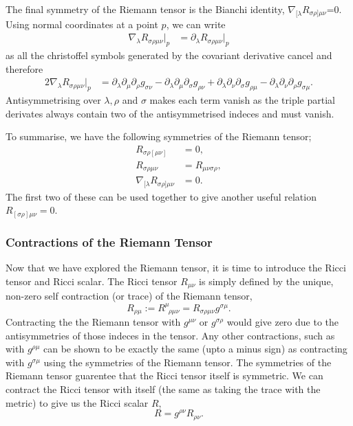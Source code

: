 The final symmetry of the Riemann tensor is the Bianchi identity, $\nabla_{[\lambda}R_{\sigma\rho]\mu\nu}$=0. Using normal coordinates at a point $p$, we can write
\begin{align}
\nabla_\lambda R_{\sigma\rho\mu\nu}\big|_p &= \partial_\lambda R_{\sigma\rho\mu\nu}\big|_p
\end{align}
as all the christoffel symbols generated by the covariant derivative cancel and therefore
\begin{align}
2\nabla_\lambda R_{\sigma\rho\mu\nu}\big|_p &= \partial_\lambda \partial_{\mu} \partial_\rho g_{\sigma\nu} - \partial_\lambda \partial_{\mu} \partial_\sigma g_{\rho\nu} + \partial_\lambda \partial_{\nu} \partial_\sigma g_{\rho\mu} - \partial_\lambda \partial_{\nu} \partial_\rho g_{\sigma\mu}.
\end{align}
Antisymmetrising over $\lambda,\rho$ and $\sigma$ makes each term vanish as the triple partial derivates always contain two of the antisymmetrised indeces and must vanish.

To summarise, we have the following symmetries of the Riemann tensor; 
\begin{align}
R_{\sigma\rho[\mu\nu]}&=0, \\
R_{\sigma\rho\mu\nu}&=R_{\mu\nu\sigma\rho},\\
\nabla_{[\lambda}R_{\sigma\rho]\mu\nu}&=0. \label{intro:eq:bianchi}
\end{align}
 The first two of these can be used together to give another useful relation $R_{[\sigma\rho]\mu\nu} =0$.



\subsubsection{Contractions of the Riemann Tensor}
Now that we have explored the Riemann tensor, it is time to introduce the Ricci tensor and Ricci scalar. The Ricci tensor $R_{\mu\nu}$ is simply defined by the unique, non-zero self contraction (or trace) of the Riemann tensor,
\begin{equation}
R_{\rho\mu} := R^\mu_{\,\,\,\rho\mu\nu} = R_{\sigma\rho\mu\nu}g^{\sigma\mu}.
\end{equation}
Contracting the the Riemann tensor with $g^{\mu\nu}$ or $g^{\sigma\rho}$ would give zero due to the antisymmetries of those indeces in the tensor. Any other contractions, such as with $g^{\rho\mu}$ can be shown to be exactly the same (upto a minus sign) as contracting with $g^{\sigma \mu}$ using the symmetries of the Riemann tensor. The symmetries of the Riemann tensor guarentee that the Ricci tensor itself is symmetric. We can contract the Ricci tensor with itself (the same as taking the trace with the metric) to give us the Ricci scalar $R$,
\begin{equation}
R=g^{\rho\nu}R_{\rho\nu}.
\end{equation}

